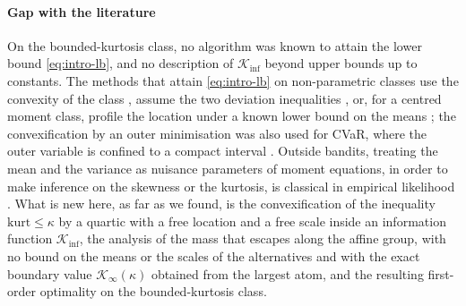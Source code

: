 \documentclass[11pt]{article}
\begin{document}
\paragraph{Gap with the literature} On the bounded-kurtosis class, no algorithm was known to attain the
lower bound \eqref{eq:intro-lb}, and no description of $\mathcal{K}_{\inf}$ beyond upper bounds up to constants.
The methods that attain \eqref{eq:intro-lb} on non-parametric classes use the convexity of the
class \citep{AJK21}, assume the two deviation inequalities \citep{PA26}, or, for a centred moment class, profile
the location under a known lower bound on the means \citep{BSH23}; the convexification by an outer
minimisation was also used for CVaR, where the outer variable is confined to a compact interval
\citep{AKJ21,A22}. Outside bandits, treating the mean and the variance as nuisance parameters of moment
equations, in order to make inference on the skewness or the kurtosis, is classical in empirical likelihood
\citep[see also][Sections~1.1 and 3.5]{O01}. What is new here, as far as we found, is the convexification of the
inequality $\mathrm{kurt}\le\kappa$ by a quartic with a free location and a free scale inside an information function
$\mathcal{K}_{\inf}$, the analysis of the mass that escapes along the affine group, with no bound on the means or
the scales of the alternatives and with the exact boundary value $\mathcal K_\infty(\kappa)$ obtained from the
largest atom, and the resulting first-order optimality on the bounded-kurtosis class.
\end{document}

